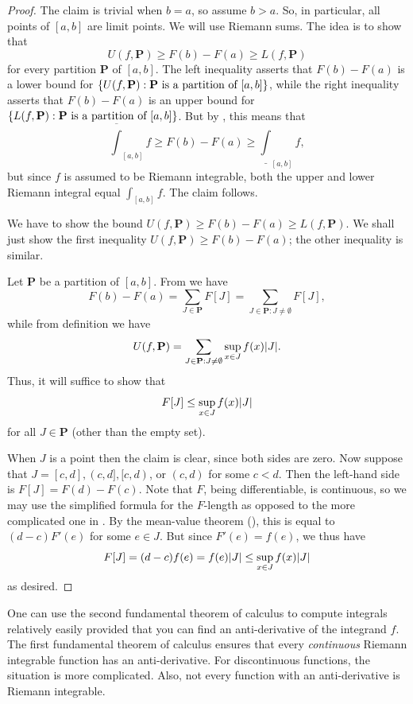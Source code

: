 \begin{proof}
  The claim is trivial when \(b = a\), so assume \(b > a\).
  So, in particular, all points of \([a, b]\) are limit points.
  We will use Riemann sums.
  The idea is to show that
  \[
    U(f, \mathbf{P}) \geq F(b) - F(a) \geq L(f, \mathbf{P})
  \]
  for every partition \(\mathbf{P}\) of \([a, b]\).
  The left inequality asserts that \(F(b) - F(a)\) is a lower bound for \(\left\lbrace U(f, \mathbf{P}) : \mathbf{P} \text{ is a partition of } [a, b]\right\rbrace\), while the right inequality asserts that \(F(b) - F(a)\) is an upper bound for \(\left\lbrace L(f, \mathbf{P}) : \mathbf{P} \text{ is a partition of } [a, b]\right\rbrace\).
  But by , this means that
  \[
    \overline{\int}_{[a, b]} f \geq F(b) - F(a) \geq \underline{\int}_{[a, b]} f,
  \]
  but since \(f\) is assumed to be Riemann integrable, both the upper and lower Riemann integral equal \(\int_{[a, b]} f\).
  The claim follows.

  We have to show the bound \(U(f, \mathbf{P}) \geq F(b) - F(a) \geq L(f, \mathbf{P})\).
  We shall just show the first inequality \(U(f, \mathbf{P}) \geq F(b) - F(a)\);
  the other inequality is similar.

  Let \(\mathbf{P}\) be a partition of \([a, b]\).
  From  we have
  \[
    F(b) - F(a) = \sum_{J \in \mathbf{P}} F[J] = \sum_{J \in \mathbf{P} : J \neq \emptyset} F[J],
  \]
  while from definition we have
  \[
    U(f, \mathbf{P}) = \sum_{J \in \mathbf{P} : J \neq \emptyset} \sup_{x \in J} f(x) \abs{J}.
  \]
  Thus, it will suffice to show that
  \[
    F[J] \leq \sup_{x \in J} f(x) \abs{J}
  \]
  for all \(J \in \mathbf{P}\)
  (other than the empty set).

  When \(J\) is a point then the claim is clear, since both sides are zero.
  Now suppose that \(J = [c, d], (c, d], [c, d)\), or \((c, d)\) for some \(c < d\).
  Then the left-hand side is \(F[J] = F(d) - F(c)\).
  Note that \(F\), being differentiable, is continuous, so we may use the simplified formula for the \(F\)-length as opposed to the more complicated one in .
  By the mean-value theorem (), this is equal to \((d - c) F'(e)\) for some \(e \in J\).
  But since \(F'(e) = f(e)\), we thus have
  \[
    F[J] = (d - c) f(e) = f(e) \abs{J} \leq \sup_{x \in J} f(x) \abs{J}
  \]
  as desired.
\end{proof}

\begin{note}
  One can use the second fundamental theorem of calculus to compute integrals relatively easily provided that you can find an anti-derivative of the integrand \(f\).
  The first fundamental theorem of calculus ensures that every \emph{continuous} Riemann integrable function has an anti-derivative.
  For discontinuous functions, the situation is more complicated.
  Also, not every function with an anti-derivative is Riemann integrable.
\end{note}

